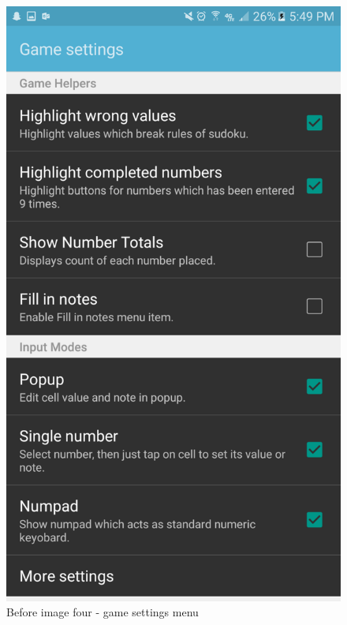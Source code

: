 \documentclass[10pt]{article}
\begin{document}
\begin{figure}
\includegraphics[width=\linewidth]{img/before4.png}
\caption{Before image four - game settings menu}
\end{figure}
\end{document}
